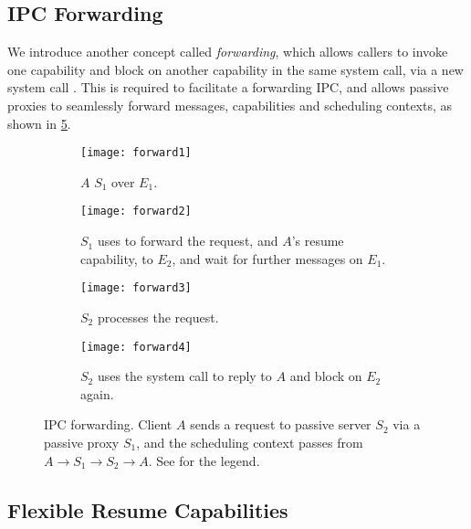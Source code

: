 \subsection{IPC Forwarding}

We introduce another concept called \emph{forwarding}, which allows callers to
invoke one capability and block on another capability in the same system call, via
a new system call . This is required to
facilitate a forwarding IPC, and allows passive proxies to seamlessly forward messages,
capabilities and scheduling contexts, as shown in \cref{f:model-forward}. 

\begin{figure}
    \centering
    \begin{subfigure}[h]{0.8\textwidth}
        \centering
        \texttt{[image: forward1]}
        \caption{$A$  $S_{1}$ over $E_{1}$.}
        \label{f:forward1}
    \end{subfigure}
    \begin{subfigure}[h]{0.8\textwidth}
        \centering
        \texttt{[image: forward2]}
        \caption{$S_{1}$ uses  to forward the request, and $A$'s resume 
            capability, to $E_{2}$, and
        wait for further messages on $E_{1}$.}
        \label{f:forward2}
    \end{subfigure}
    \begin{subfigure}[h]{0.8\textwidth}
        \centering
        \texttt{[image: forward3]}
        \caption{$S_{2}$ processes the request.}
        \label{f:forward4}
    \end{subfigure}
    \begin{subfigure}[h]{0.8\textwidth}
        \centering
        \texttt{[image: forward4]}
        \caption{$S_{2}$ uses the  system call to reply to $A$ and block on
        $E_{2}$ again. }
        \label{f:forward4}
\end{subfigure}
\caption{IPC forwarding. Client $A$ sends a request to passive server $S_{2}$ via a passive proxy $S_{1}$,
and the scheduling context passes from $A \rightarrow S_{1} \rightarrow S_{2} \rightarrow A$. See  for the legend.}
\label{f:model-forward}
\end{figure}

\subsection{Flexible Resume Capabilities}

